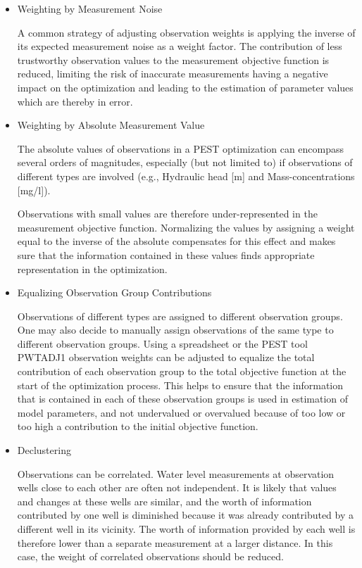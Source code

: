 \begin{itemize}

\item Weighting by Measurement Noise

A common strategy of adjusting observation weights is applying the inverse of its expected measurement noise as a weight factor. The contribution of less trustworthy observation values to the measurement objective function is reduced, limiting the risk of inaccurate measurements having a negative impact on the optimization and leading to the estimation of parameter values which are thereby in error.

\item Weighting by Absolute Measurement Value

The absolute values of observations in a PEST optimization can encompass several orders of magnitudes, especially (but not limited to) if observations of different types are involved (e.g., Hydraulic head [m] and Mass-concentrations [mg/l]).

Observations with small values are therefore under-represented in the measurement objective function. Normalizing the values by assigning a weight equal to the inverse of the absolute compensates for this effect and makes sure that the information contained in these values finds appropriate representation in the optimization.

\item Equalizing Observation Group Contributions
 
Observations of different types are assigned to different observation groups. One may also decide to manually assign observations of the same type to different observation groups. Using a spreadsheet or the PEST tool PWTADJ1 observation weights can be adjusted to equalize the total contribution of each observation group to the total objective function at the start of the optimization process. This helps to ensure that the information that is contained in each of these observation groups is used in estimation of model parameters, and not undervalued or overvalued because of too low or too high a contribution to the initial objective function.

\item Declustering
 
Observations can be correlated. Water level measurements at observation wells close to each other are often not independent. It is likely that values and changes at these wells are similar, and the worth of information contributed by one well is diminished because it was already contributed by a different well in its vicinity. The worth of information provided by each well is therefore lower than a separate measurement at a larger distance. In this case, the weight of correlated observations should be reduced.


\end{itemize}
